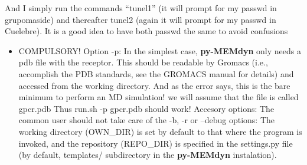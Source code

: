 \documentclass[10pt, oneside, pdftex]{article}
\begin{document}
\begin{enumerate}
{And I simply run the commands ``tunel1'' (it will prompt for my passwd
in grupomaside)  and thereafter  tunel2 (again it  will prompt  for my
passwd in Cuelebre). It is a good idea to have both passwd the same to
avoid confusions}
\end{enumerate}

\begin{itemize}
\item{COMPULSORY! Option -p:  In the simplest case, \textbf{py-MEMdyn}
  only needs a pdb file with the receptor.  This should be readable by
  Gromacs (i.e., accomplish the  PDB standards, see the GROMACS manual
  for details)  and accessed  from the working  directory. And  as the
  error says, this is the bare minimum to perform an MD simulation! we
  will assume that the file is called gpcr.pdb Thus run.sh -p gpcr.pdb
  should work!  Accesory options: The common user should not take care
  of the -b,  -r or --debug options: The  working directory (OWN\_DIR)
  is set  by default  to that  where the program  is invoked,  and the
  repository  (REPO\_DIR) is  specified  in the  settings.py file  (by
  default,   templates/   subdirectory   in   the   \textbf{py-MEMdyn}
  instalation).}
  

\end{itemize}
\end{document}
